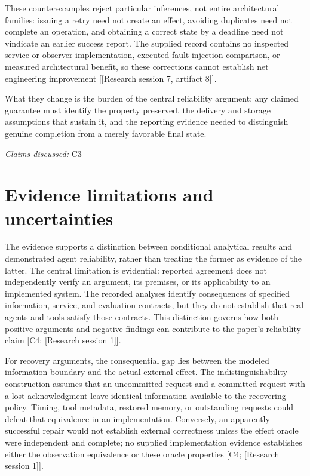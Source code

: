 \documentclass[11pt]{article}
\begin{document}
These counterexamples reject particular inferences, not entire architectural families: issuing a retry need not create an effect, avoiding duplicates need not complete an operation, and obtaining a correct state by a deadline need not vindicate an earlier success report. The supplied record contains no inspected service or observer implementation, executed fault-injection comparison, or measured architectural benefit, so these corrections cannot establish net engineering improvement [[Research session 7, artifact 8]].

What they change is the burden of the central reliability argument: any claimed guarantee must identify the property preserved, the delivery and storage assumptions that sustain it, and the reporting evidence needed to distinguish genuine completion from a merely favorable final state.

\textit{Claims discussed: }C3
\section{Evidence limitations and uncertainties}
The evidence supports a distinction between conditional analytical results and demonstrated agent reliability, rather than treating the former as evidence of the latter. The central limitation is evidential: reported agreement does not independently verify an argument, its premises, or its applicability to an implemented system. The recorded analyses identify consequences of specified information, service, and evaluation contracts, but they do not establish that real agents and tools satisfy those contracts. This distinction governs how both positive arguments and negative findings can contribute to the paper\textquoteright{}s reliability claim [C4; [Research session 1]].

For recovery arguments, the consequential gap lies between the modeled information boundary and the actual external effect. The indistinguishability construction assumes that an uncommitted request and a committed request with a lost acknowledgment leave identical information available to the recovering policy. Timing, tool metadata, restored memory, or outstanding requests could defeat that equivalence in an implementation. Conversely, an apparently successful repair would not establish external correctness unless the effect oracle were independent and complete; no supplied implementation evidence establishes either the observation equivalence or these oracle properties [C4; [Research session 1]].
\end{document}
